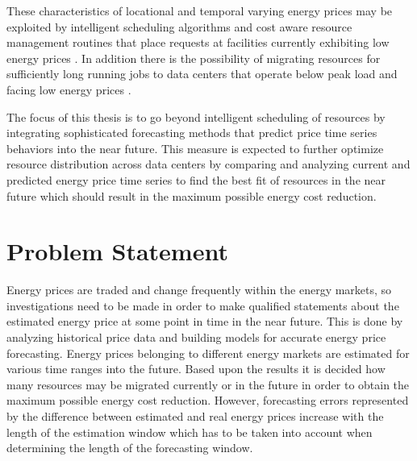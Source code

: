 These characteristics of locational and temporal varying energy prices may be exploited by intelligent scheduling algorithms and cost aware resource management routines that place requests at facilities currently exhibiting low energy prices \cite{rao2010minimizing}. In addition there is the possibility of migrating resources for sufficiently long running jobs to data centers that operate below peak load and facing low energy prices \cite{buchbinder2011online}.

The focus of this thesis is to go beyond intelligent scheduling of resources by integrating sophisticated forecasting methods that predict price time series behaviors into the near future. This measure is expected to further optimize resource distribution across data centers by comparing and analyzing current and predicted energy price time series to find the best fit of resources in the near future which should result in the maximum possible energy cost reduction.



\section{Problem Statement}

Energy prices are traded and change frequently within the energy markets, so investigations need to be made in order to make qualified statements about the estimated energy price at some point in time in the near future.
This is done by analyzing historical price data and building models for accurate energy price forecasting. Energy prices belonging to different energy markets are estimated for various time ranges into the future. Based upon the results it is decided how many resources may be migrated currently or in the future in order to obtain the maximum possible energy cost reduction. 
However, forecasting errors represented by the difference between estimated and real energy prices increase with the length of the estimation window which has to be taken into account when determining the length of the forecasting window. 

